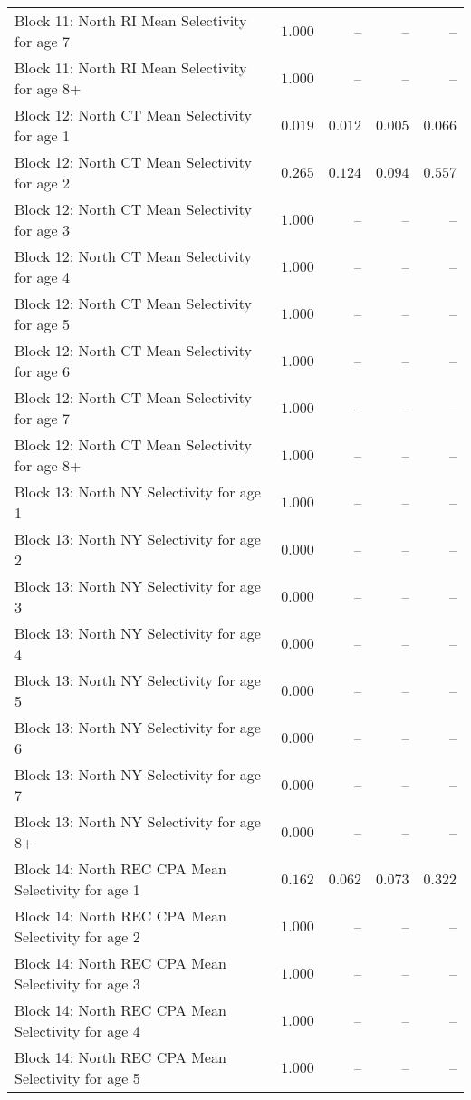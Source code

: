 \documentclass[
]{article}
\begin{document}
\begin{landscape}
\begin{longtable}[t]{lrrrr}
Block 11: North RI Mean Selectivity for age 7 & $1.000$ & -- & -- & --\\
Block 11: North RI Mean Selectivity for age 8+ & $1.000$ & -- & -- & --\\
\addlinespace
Block 12: North CT Mean Selectivity for age 1 & $0.019$ & $0.012$ & $0.005$ & $0.066$\\
Block 12: North CT Mean Selectivity for age 2 & $0.265$ & $0.124$ & $0.094$ & $0.557$\\
Block 12: North CT Mean Selectivity for age 3 & $1.000$ & -- & -- & --\\
Block 12: North CT Mean Selectivity for age 4 & $1.000$ & -- & -- & --\\
Block 12: North CT Mean Selectivity for age 5 & $1.000$ & -- & -- & --\\
\addlinespace
Block 12: North CT Mean Selectivity for age 6 & $1.000$ & -- & -- & --\\
Block 12: North CT Mean Selectivity for age 7 & $1.000$ & -- & -- & --\\
Block 12: North CT Mean Selectivity for age 8+ & $1.000$ & -- & -- & --\\
Block 13: North NY Selectivity for age 1 & $1.000$ & -- & -- & --\\
Block 13: North NY Selectivity for age 2 & $0.000$ & -- & -- & --\\
\addlinespace
Block 13: North NY Selectivity for age 3 & $0.000$ & -- & -- & --\\
Block 13: North NY Selectivity for age 4 & $0.000$ & -- & -- & --\\
Block 13: North NY Selectivity for age 5 & $0.000$ & -- & -- & --\\
Block 13: North NY Selectivity for age 6 & $0.000$ & -- & -- & --\\
Block 13: North NY Selectivity for age 7 & $0.000$ & -- & -- & --\\
\addlinespace
Block 13: North NY Selectivity for age 8+ & $0.000$ & -- & -- & --\\
Block 14: North REC CPA Mean Selectivity for age 1 & $0.162$ & $0.062$ & $0.073$ & $0.322$\\
Block 14: North REC CPA Mean Selectivity for age 2 & $1.000$ & -- & -- & --\\
Block 14: North REC CPA Mean Selectivity for age 3 & $1.000$ & -- & -- & --\\
Block 14: North REC CPA Mean Selectivity for age 4 & $1.000$ & -- & -- & --\\
\addlinespace
Block 14: North REC CPA Mean Selectivity for age 5 & $1.000$ & -- & -- & --\\

\end{longtable}
\end{landscape}
\end{document}
